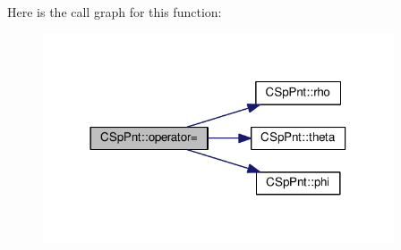 Here is the call graph for this function\-:\nopagebreak
\begin{figure}[H]
\begin{center}
\leavevmode
\includegraphics[width=294pt]{classCSpPnt_aee31a3b97c734fa150f1a33daadd6dfc_cgraph}
\end{center}
\end{figure}


